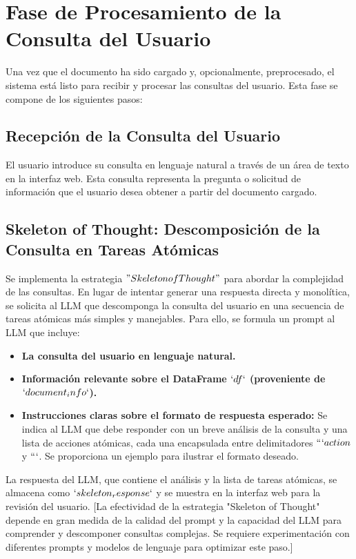 \section{Fase de Procesamiento de la Consulta del Usuario}

Una vez que el documento ha sido cargado y, opcionalmente, preprocesado, el sistema está listo para recibir y procesar las consultas del usuario. Esta fase se compone de los siguientes pasos:

\subsection{Recepción de la Consulta del Usuario}

El usuario introduce su consulta en lenguaje natural a través de un área de texto en la interfaz web. Esta consulta representa la pregunta o solicitud de información que el usuario desea obtener a partir del documento cargado.

\subsection{Skeleton of Thought: Descomposición de la Consulta en Tareas Atómicas}

Se implementa la estrategia $"Skeleton of Thought"$ para abordar la complejidad de las consultas.  En lugar de intentar generar una respuesta directa y monolítica,  se solicita al LLM que descomponga la consulta del usuario en una secuencia de tareas atómicas más simples y manejables.  Para ello, se formula un prompt al LLM que incluye:

\begin{itemize}
	\item \textbf{La consulta del usuario en lenguaje natural.}
	\item \textbf{Información relevante sobre el DataFrame $`df`$ (proveniente de $`document_info`$).}
	\item \textbf{Instrucciones claras sobre el formato de respuesta esperado:}  Se indica al LLM que debe responder con un breve análisis de la consulta y una lista de acciones atómicas,  cada una encapsulada entre delimitadores $```action$ y $```$.  Se proporciona un ejemplo para ilustrar el formato deseado.
\end{itemize}
La respuesta del LLM, que contiene el análisis y la lista de tareas atómicas,  se almacena como $`skeleton_response`$ y se muestra en la interfaz web para la revisión del usuario. [La efectividad de la estrategia "Skeleton of Thought" depende en gran medida de la calidad del prompt y la capacidad del LLM para comprender y descomponer consultas complejas.  Se requiere experimentación con diferentes prompts y modelos de lenguaje para optimizar este paso.]

